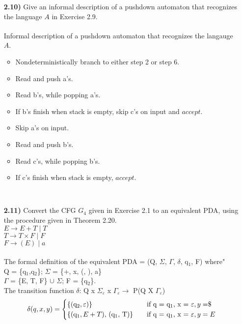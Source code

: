 \documentclass[12pt]{letter}
\begin{document}
\begin{enumerate}
\item[\textbf{2.10)}] Give an informal description of a pushdown automaton that recognizes the language $A$ in Exercise 2.9.\\
\leavevmode \\ 
Informal description of a pushdown automaton that recognizes the langauge $A$.\\
\begin{itemize}
	\item Nondeterministically branch to either step 2 or step 6.
	\item Read and push a's.
	\item Read b's, while popping a's.
	\item If b's finish when stack is empty, skip c's on input and $accept$.
	\item Skip a's on input.
	\item Read and push b's.
	\item Read c's, while popping b's.
	\item If c's finish when stack is empty, $accept$.
\end{itemize}
\leavevmode \\ 

\item[\textbf{2.11)}] Convert the CFG $G_4$ given in Exercise 2.1 to an equivalent PDA, using the procedure given in Theorem 2.20.\\
\setlength\parindent{150pt} $E \rightarrow E + T \mid T $ \\ $T \rightarrow T \times F \mid F $ \\ $F \rightarrow (E)  \mid  a$ \\  \setlength\parindent{0pt}
\leavevmode \\
	 The formal definition of the equivalent PDA =	(Q, $\Sigma$, $\Gamma$, $\delta$, q$_{1}$, F) where" \\
	Q = \{q$_{1}$,q$_{2}$\}; $\Sigma$ = \{+, x, (, ), a\}\\$\Gamma$ = \{E, T, F\} $\cup$ $\Sigma$; F = \{q$_{2}$\}.\\
	The transition function $\delta$: Q x $\Sigma _{\varepsilon}$ x $\Gamma_{\varepsilon} \longrightarrow$ P(Q X $\Gamma_{\varepsilon}$)\\
	\[   
	\delta(q,x,y) = 
	\begin{cases}
	\text{\{(q$_{2}, \varepsilon$)\}} 
	&\quad\text{if q = q$_{1}$, x = $\varepsilon$}, y =  $\textdollar$ \\
	
	\text{\{(q$_{1}, E+T$), (q$_{1}$, T)\}} 
	&\quad\text{if q = q$_{1}$, x = $\varepsilon$}, y = E \\
	

\end{cases}\]
\end{enumerate}
\end{document}
